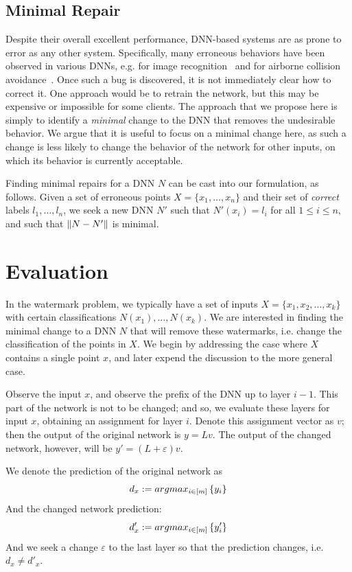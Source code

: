 \documentclass{easychair}
\begin{document}
\subsection{Minimal Repair}
Despite their overall excellent performance, DNN-based systems are as
prone to error as any other system. Specifically, many erroneous
behaviors have been observed in various DNNs, e.g. for image
recognition~\cite{X,Y} and for airborne collision
avoidance~\cite{JuLoBrOwKo16,KaBaDiJuKo17Reluplex}. Once such a bug is
discovered, it is not immediately clear how to correct it. One
approach would be to retrain the network, but this may be expensive
or impossible for some clients. The approach that we propose here is
simply to identify a \emph{minimal} change to the DNN that removes the
undesirable behavior. We argue that it is useful to focus on a minimal
change here, as such a change is less likely to change the behavior of
the network for other inputs, on which its behavior is currently acceptable.

Finding minimal repairs for a DNN $N$ can be cast into our
formulation, as follows. Given a set of erroneous points
$X=\{x_1,\ldots,x_n\}$ and their set of \emph{correct} labels
$l_1,\ldots,l_n$, we seek a new DNN $N'$ such that $N'(x_i)=l_i$ for
all $1\leq i \leq n$, and such that 
 $\left\lVert N-N'\right\rVert$ is minimal. 

\section{Evaluation}

In the watermark problem, we typically have a set of inputs $X=\{x_1,
x_2, \ldots, x_k\}$ with certain classifications
$N(x_1),\ldots,N(x_k)$. We are interested in finding the minimal
change to a DNN $N$ that will remove these watermarks, i.e. change the
classification of the points in $X$. We begin by addressing the case
where $X$ contains a single point $x$, and later expend the discussion
to the more general case.

Observe the input $x$, and observe the prefix of the DNN up to layer
$i-1$. This part of the network is not to be changed; and so, we
evaluate these layers for input $x$, obtaining an assignment for layer
$i$. Denote this assignment vector as $v$; then the output of the
original network is $y=Lv$. The output of the changed network,
however, will be $y'=(L+\varepsilon)v$.

We denote the prediction of the original network as 
\[
   	d_x := argmax_{i\in \left[m\right]}\left\lbrace y_i\right\rbrace
\]
And the changed network prediction:
\[
   	d'_x := argmax_{i\in \left[m\right]}\left\lbrace y'_i\right\rbrace
\]
And we seek a change $\varepsilon$ to the last layer so that the prediction changes, i.e. $d_x\neq d'_x$.
\end{document}
